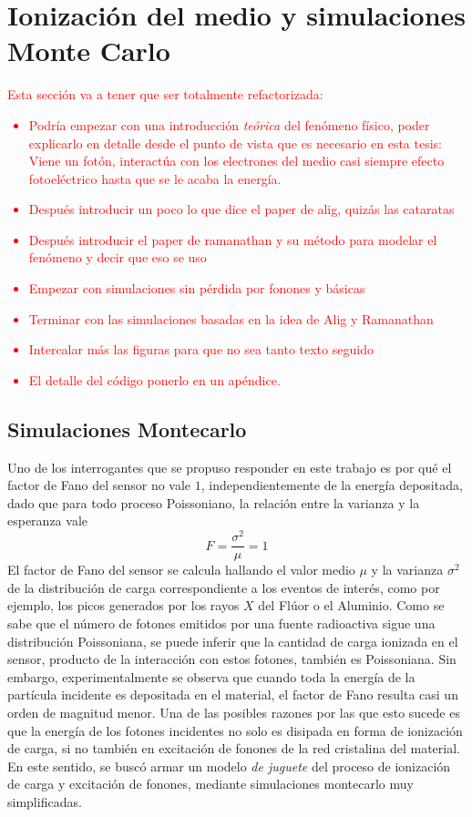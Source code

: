\chapter{Ionización del medio y simulaciones Monte Carlo}
\textcolor{red}{Esta sección va a tener que ser totalmente refactorizada:
\begin{itemize}
    \item Podría empezar con una introducción \textit{teórica} del fenómeno físico, poder explicarlo en detalle desde el punto de vista que es necesario en esta tesis: Viene un fotón, interactúa con los electrones del medio casi siempre efecto fotoeléctrico hasta que se le acaba la energía.
    \item Después introducir un poco lo que dice el paper de alig, quizás las cataratas
    \item Después introducir el paper de ramanathan y su método para modelar el fenómeno y decir que eso se uso
    \item Empezar con simulaciones sin pérdida por fonones y básicas
    \item Terminar con las simulaciones basadas en la idea de Alig y Ramanathan
    \item Intercalar más las figuras para que no sea tanto texto seguido
    \item El detalle del código ponerlo en un apéndice.
\end{itemize}}
\section{Simulaciones Montecarlo}
\noindent Uno de los interrogantes que se propuso responder en este trabajo es por qué el factor de Fano del sensor no vale $1$, independientemente de la energía depositada, dado que para todo proceso Poissoniano, la relación entre la varianza y la esperanza vale
\begin{equation*}
    F = \frac{\sigma^{2}}{\mu} = 1
\end{equation*} 
El factor de Fano del sensor se calcula hallando el valor medio $\mu$ y la varianza $\sigma^{2}$ de la distribución de carga correspondiente a los eventos de interés, como por ejemplo, los picos generados por los rayos $X$ del Flúor o el Aluminio. Como se sabe que el número de fotones emitidos por una fuente radioactiva sigue una distribución Poissoniana, se puede inferir que la cantidad de carga ionizada en el sensor, producto de la interacción con estos fotones, también es Poissoniana. Sin embargo, experimentalmente se observa que cuando toda la energía de la partícula incidente es depositada en el material, el factor de Fano resulta casi un orden de magnitud menor\cite{TesisKevin}. Una de las posibles razones por las que esto sucede es que la energía de los fotones incidentes no solo es disipada en forma de ionización de carga, si no también en excitación de fonones de la red cristalina del material.\\
\indent En este sentido, se buscó armar un modelo \textit{de juguete} del proceso de ionización de carga y excitación de fonones, mediante simulaciones montecarlo muy simplificadas.

